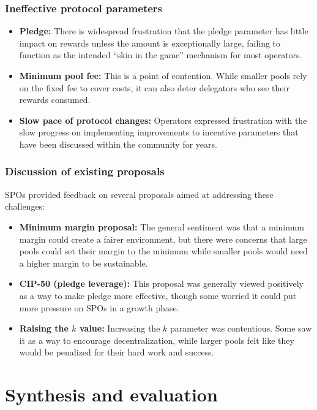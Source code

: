 \documentclass[11pt, letterpaper]{article}
\begin{document}
\subsubsection{Ineffective protocol parameters}
\begin{itemize}
	\item \textbf{Pledge:} There is widespread frustration that the pledge parameter has little impact on
	      rewards unless the amount is exceptionally large, failing to function as the intended ``skin in the game''
	      mechanism for most operators.
	\item \textbf{Minimum pool fee:} This is a point of contention. While smaller pools rely on the fixed fee
	      to cover costs, it can also deter delegators who see their rewards consumed. 
	\item \textbf{Slow pace of protocol changes:} Operators expressed frustration with the slow progress on
	      implementing improvements to incentive parameters that have been discussed within the community for years.
\end{itemize}

\subsubsection{Discussion of existing proposals}
SPOs provided feedback on several proposals aimed at addressing these
challenges:
\begin{itemize}
	\item \textbf{Minimum margin proposal:} The general sentiment was that a minimum margin could create a
	      fairer environment, but there were concerns that large pools could set their margin to the minimum while
	      smaller pools would need a higher margin to be sustainable.
	\item \textbf{CIP-50 (pledge leverage):} This proposal was generally viewed positively as a way to make
	      pledge more effective, though some worried it could put more pressure on SPOs in a growth phase.
	\item \textbf{Raising the $k$ value:} Increasing the $k$ parameter was contentious. Some saw it as a way to
	      encourage decentralization, while larger pools felt like they would be penalized for their hard work and
	      success.
\end{itemize}


\section{Synthesis and evaluation}
\end{document}
